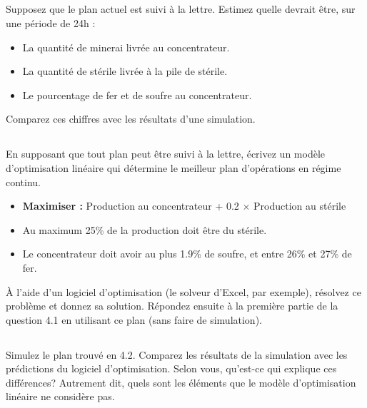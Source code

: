 \documentclass[letterpaper,12pt]{article}
\begin{document}
	\subsection{}
	Supposez que le plan actuel est suivi à la lettre. Estimez quelle devrait être, sur une période de 24h : 
	
	\begin{itemize}
		\item La quantité de minerai livrée au concentrateur.
		\item La quantité de stérile livrée à la pile de stérile.
		\item Le pourcentage de fer et de soufre au concentrateur.
	\end{itemize}
	
	Comparez ces chiffres avec les résultats d'une simulation.
	
	\subsection{}
	En supposant que tout plan peut être suivi à la lettre, écrivez un modèle d'optimisation linéaire qui détermine le meilleur plan d'opérations en régime continu. 
	
	\begin{itemize}
		\item \textbf{Maximiser : }  Production au concentrateur + 0.2 $\times$ Production au stérile
		\item Au maximum 25\% de la production doit être du stérile.
		\item Le concentrateur doit avoir au plus 1.9\% de soufre, et entre 26\% et 27\% de fer.
	\end{itemize}
	
	À l'aide d'un logiciel d'optimisation (le solveur d'Excel, par exemple), résolvez ce problème et donnez sa solution. Répondez ensuite à la première partie de la question 4.1 en utilisant ce plan (sans faire de simulation).
	
	\subsection{}
	
	Simulez le plan trouvé en 4.2. Comparez les résultats de la simulation avec les prédictions du logiciel d'optimisation. Selon vous, qu'est-ce qui explique ces différences? Autrement dit, quels sont les éléments que le modèle d'optimisation linéaire ne considère pas.
	
	\subsection{}
	
\end{document}
